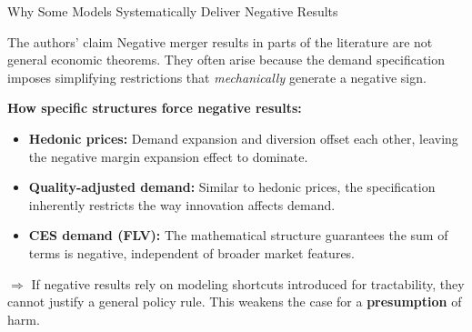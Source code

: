 \documentclass[10pt, aspectratio=169]{beamer}
\begin{document}
\begin{frame}{Why Some Models Systematically Deliver Negative Results}
\small

\begin{block}{The authors' claim}
Negative merger results in parts of the literature are not general economic theorems. They often arise because the demand specification imposes simplifying restrictions that \textit{mechanically} generate a negative sign.
\end{block}

\vspace{0.7em}

\textbf{How specific structures force negative results:}
\vspace{0.3em}
\begin{itemize}
    \setlength\itemsep{0.65em}
    \item \textbf{Hedonic prices:} Demand expansion and diversion offset each other, leaving the negative margin expansion effect to dominate.
    \item \textbf{Quality-adjusted demand:} Similar to hedonic prices, the specification inherently restricts the way innovation affects demand.
    \item \textbf{CES demand (FLV):} The mathematical structure guarantees the sum of terms is negative, independent of broader market features.
\end{itemize}

\vspace{0.9em}
$\Rightarrow$ If negative results rely on modeling shortcuts introduced for tractability, they cannot justify a general policy rule. This weakens the case for a \textbf{presumption} of harm.

\end{frame}

\end{document}

